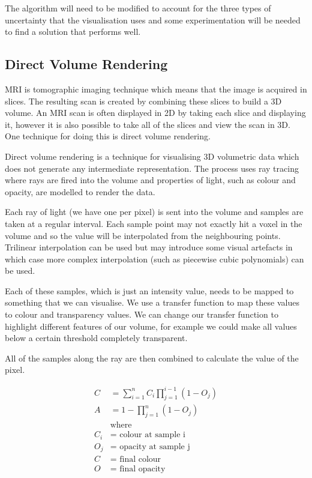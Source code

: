 \documentclass[
  oneside,
  11pt, a4paper,
  footinclude=true,
  headinclude=true,
  cleardoublepage=empty
]{scrbook}
\begin{document}
The algorithm will need to be modified to account for the three types of uncertainty that the visualisation uses and some experimentation will be needed to find a solution that performs well.

\newpage
\subsection{Direct Volume Rendering\cite{nvidia:volumerendering}}
MRI is tomographic imaging technique which means that the image is acquired in slices. The resulting scan is created by combining these slices to build a 3D volume. An MRI scan is often displayed in 2D by taking each slice and displaying it, however it is also possible to take all of the slices and view the scan in 3D. One technique for doing this is direct volume rendering.

Direct volume rendering is a technique for visualising 3D volumetric data which does not generate any intermediate representation. The process uses ray tracing where rays are fired into the volume and properties of light, such as colour and opacity, are modelled to render the data.

Each ray of light (we have one per pixel) is sent into the volume and samples are taken at a regular interval. Each sample point may not exactly hit a voxel in the volume and so the value will be interpolated from the neighbouring points. Trilinear interpolation can be used but may introduce some visual artefacts in which case more complex interpolation (such as piecewise cubic polynomials) can be used.

Each of these samples, which is just an intensity value, needs to be mapped to something that we can visualise. We use a transfer function to map these values to colour and transparency values. We can change our transfer function to highlight different features of our volume, for example we could make all values below a certain threshold completely transparent.

All of the samples along the ray are then combined to calculate the value of the pixel.

\begin{align*}
	C &= \sum\limits_{i=1}^n C_{i}\prod\limits_{j=1}^{i-1}(1 - O_j) \\
	A &= 1 - \prod\limits_{j=1}^n(1 - O_j) \\
	& \text{where} \\
	C_i &= \text{ colour at sample i} \\
	O_j &= \text{ opacity at sample j} \\
	C &= \text{ final colour} \\
	O &= \text{ final opacity}
\end{align*}
\end{document}
